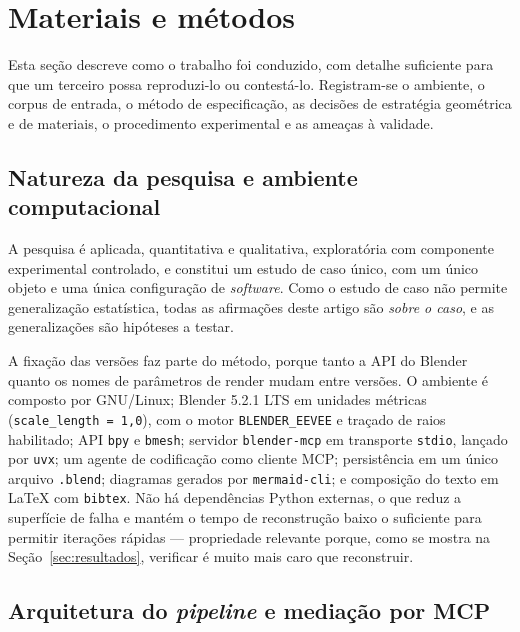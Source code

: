 \section{Materiais e m\'etodos}
\label{sec:metodos}

Esta se\c{c}\~ao descreve como o trabalho foi conduzido, com detalhe suficiente para que um
terceiro possa reproduzi-lo ou contest\'a-lo. Registram-se o ambiente, o corpus de entrada, o
m\'etodo de especifica\c{c}\~ao, as decis\~oes de estrat\'egia geom\'etrica e de materiais, o
procedimento experimental e as amea\c{c}as \`a validade.

\subsection{Natureza da pesquisa e ambiente computacional}

A pesquisa \'e aplicada, quantitativa e qualitativa, explorat\'oria com componente
experimental controlado, e constitui um estudo de caso \'unico, com um \'unico objeto e
uma \'unica configura\c{c}\~ao de \emph{software}. Como o estudo de caso n\~ao permite
generaliza\c{c}\~ao estat\'istica, todas as afirma\c{c}\~oes deste artigo s\~ao
\emph{sobre o caso}, e as generaliza\c{c}\~oes s\~ao hip\'oteses a testar.

A fixa\c{c}\~ao das vers\~oes faz parte do m\'etodo, porque tanto a API do Blender quanto os
nomes de par\^ametros de render mudam entre vers\~oes. O ambiente \'e composto por
GNU/Linux; Blender 5.2.1 LTS em unidades m\'etricas (\texttt{scale\_length = 1,0}), com o
motor \texttt{BLENDER\_EEVEE} e tra\c{c}ado de raios habilitado; API \texttt{bpy} e
\texttt{bmesh}; servidor \texttt{blender-mcp} \cite{blendermcp2025} em transporte
\texttt{stdio}, lan\c{c}ado por \texttt{uvx}; um agente de codifica\c{c}\~ao como cliente
MCP; persist\^encia em um \'unico arquivo \texttt{.blend}; diagramas gerados por
\texttt{mermaid-cli}; e composi\c{c}\~ao do texto em \LaTeX{} com \texttt{bibtex}.
N\~ao h\'a depend\^encias Python externas, o que reduz a superf\'icie de falha e
mant\'em o tempo de reconstru\c{c}\~ao baixo o suficiente para permitir
itera\c{c}\~oes r\'apidas --- propriedade relevante porque, como se mostra na
Se\c{c}\~ao~\ref{sec:resultados}, verificar \'e muito mais caro que reconstruir.

\subsection{Arquitetura do \emph{pipeline} e media\c{c}\~ao por MCP}

